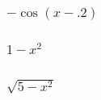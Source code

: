 \documentclass[11pt]{article} %
\begin{document}
\subsubsection*{$-\cos(x-.2)$}
\begin{alltt}

\end{alltt}
\subsubsection*{$1-x^2$}
\begin{alltt}


\end{alltt}
\subsubsection*{$\sqrt{5-x^2}$}
\begin{alltt}


\end{alltt}
\end{document}
